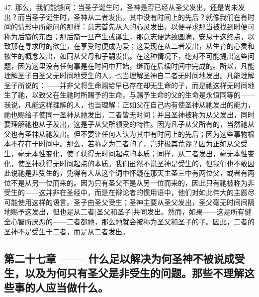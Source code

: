 47. 那么，我们能够问：当圣子诞生时，圣神是否已经从圣父发出，还是尚未发出？而当圣子诞生时，圣神从二者发出，其中没有时间上的先后？就像我们在有时间的情形中所能问的那样：意志首先从人的心灵发出，以便寻求那当被找到时便可称为后裔的东西；那后裔一旦产生或诞生，那意志便达致圆满，安息于这终点，以致那在寻求时的欲望，在享受时便成为爱；这爱现在从二者发出，从生育的心灵和被生的概念发出，如同从父母和子嗣发出。在这种情况下，绝对不可能提出这些问题，因为这里没有任何事是在时间中开始，继而在后续时间中完成的。所以，凡能理解圣子自圣父无时间地受生的人，也当理解圣神自二者无时间地发出。凡能理解圣子所说的：——并非父将生命赐给早已存在却无生命的子，而是祂这样无时间地生了祂，以致父在生祂时所赐予的生命，与赐予生命的父的生命是永恒同等的——我说，凡能这样理解的人，也当理解：正如父在自己内有使圣神从祂发出的能力，祂也赐给子使同一圣神从祂发出，二者皆无时间；并且圣神被称为从父发出，同时要理解祂也从子发出，这是子从父所领受的特性。因为凡子从父所有的，当然祂从父也有圣神从祂发出。但不要让任何人认为其中有时间上的先后；因为这些事物根本不存在于时间中。那么，若称之为二者的子，岂非极其荒谬？因为正如从父受生，毫无本性变化，使子获得无时间起点的本质；同样，从二者发出，毫无本性变化，使圣神获得无时间起点的本质。我们虽然不说圣神是受生的，但我们也不敢因此说祂是非受生的，免得有人从这个词中怀疑在那天主圣三中有两位父，或者有两位不是从另一位而来的。因为只有圣父不是从另一位而来的，因此只有祂被称为非受生的——这并非在圣经中，而是在辩论者的惯用语中，他们对如此伟大的主题尽可能使用这样的语言。圣子由圣父受生；圣神主要从圣父发出，圣父毫无时间间隔地赐予这发出，但也是从二者[圣父和圣子]共同发出。然而，如果——这是所有健全心智所厌恶的——二者都祂，那么祂就会被称为圣父和圣子的子。因此，二者的圣神不是受生于二者，而是从二者发出。\par


\subsection{第二十七章 —— 什么足以解决为何圣神不被说成受生，以及为何只有圣父是非受生的问题。那些不理解这些事的人应当做什么。}

